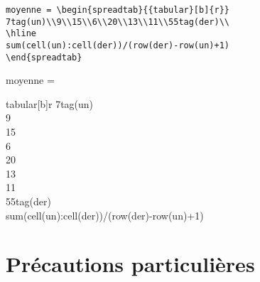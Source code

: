 \documentclass[a4paper,10pt]{article}
\begin{document}
\begin{minipage}{0.6\linewidth}
\begin{lstlisting}
moyenne = \begin{spreadtab}{{tabular}[b]{r}}
7tag(un)\\9\\15\\6\\20\\13\\11\\55tag(der)\\
\hline
sum(cell(un):cell(der))/(row(der)-row(un)+1)
\end{spreadtab}
\end{lstlisting}
\end{minipage}\hfill
\begin{minipage}{0.35\linewidth}
moyenne = \begin{spreadtab}{{tabular}[b]{r}}
7tag(un)\\9\\15\\6\\20\\13\\11\\55tag(der)\\
\hline
sum(cell(un):cell(der))/(row(der)-row(un)+1)
\end{spreadtab}
\end{minipage}

\section{Précautions particulières}
\end{document}

